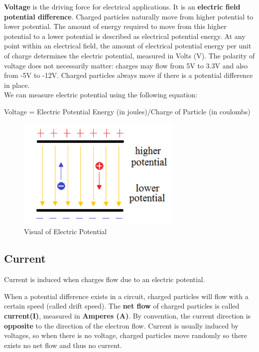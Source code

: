 \documentclass{article}
\begin{document}
\textbf{Voltage} is the driving force for electrical applications. It is an \textbf{electric field potential difference}. Charged particles naturally move from higher potential to lower potential. The amount of energy required to move from this higher potential to a lower potential is described as electrical potential energy. At any point within an electrical field, the amount of electrical potential energy per unit of charge determines the electric potential, measured in Volts (V). The polarity of voltage does not necessarily matter: charges may flow from 5V to 3.3V and also from -5V to -12V. Charged particles always move if there is a potential difference in place. 
\\We can measure electric potential using the following equation:
\begin{center}
Voltage = Electric Potential Energy (in joules)/Charge of Particle (in coulombs)
\end{center}

\begin{figure}
    \centering
    \includegraphics[width=0.7\textwidth]{img/E_Potential.png}
    \caption{Visual of Electric Potential}
    \label{fig:E_Potential}
\end{figure}

\subsection{Current}
Current is induced when charges flow due to an electric potential.

When a potential difference exists in a circuit, charged particles will flow with a certain speed (called drift speed). The \textbf{net flow} of charged particles is called \textbf{current(I)}, measured in \textbf{Amperes (A)}. By convention, the current direction is \textbf{opposite} to the direction of the electron flow. Current is usually induced by voltages, so when there is no voltage, charged particles move randomly so there exists no net flow and thus no current.
\end{document}
